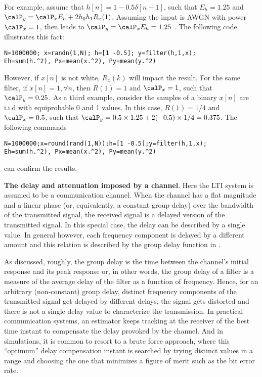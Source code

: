 For example, assume that $h[n]=1 - 0.5 \delta[n-1]$, such that $E_h = 1.25$ and $\calP_y = \calP_x E_h + 2 h_0 h_1 R_x(1)$. Assuming the input is AWGN with power $\calP_x=1$, then  leads to $\calP_y = \calP_x E_h = 1.25$ . The following code illustrates this fact:
\begin{lstlisting}
N=1000000; x=randn(1,N); h=[1 -0.5]; y=filter(h,1,x);
Eh=sum(h.^2), Px=mean(x.^2), Py=mean(y.^2)
\end{lstlisting}
However, if $x[n]$ is not white, $R_x(k)$ will impact the result. For the same filter, if $x[n]=1, \forall n$, then $R(1)=1$ and $\calP_x=1$, such that $\calP_y = 0.25$. As a third example, consider the samples of a binary $x[n]$ are i.i.d with equiprobable 0 and 1 values. In this case, $R(1)=1/4$ and $\calP_x=0.5$, such that $\calP_y = 0.5 \times 1.25 + 2(-0.5) \times 1/4 = 0.375$. The following commands
\begin{lstlisting}
N=1000000;x=round(rand(1,N));h=[1 -0.5];y=filter(h,1,x);
Eh=sum(h.^2), Px=mean(x.^2), Py=mean(y.^2)
\end{lstlisting}
can confirm the results.
\eApplication

\bApplication \textbf{The delay and attenuation imposed by a channel}.
\label{app:linear_filtering}
Here the LTI system is assumed to be a communication channel.
When the channel has a flat magnitude and a linear phase (or, equivalently, a constant group delay) over the bandwidth of the transmitted signal, the received signal is a delayed version of the transmitted signal. In this special case, the delay can be described by a single value. In general however, each frequency component is delayed by a different amount and this relation is described by the group delay function in .

As discussed, roughly, the group delay is the time between the channel's initial response and its peak response or, in other words, the group delay of a filter is a measure of the average delay of the filter as a function of frequency. Hence, for an arbitrary (non-constant) group delay, distinct frequency components of the transmitted signal get delayed by different delays, the signal gets distorted and there is not a single delay value to characterize the transmission. In practical communication systems, an estimator keeps tracking at the receiver of the best time instant to compensate the delay provoked by the channel. And in simulations, it is common to resort to a brute force approach, where this ``optimum'' delay compensation instant is searched by trying distinct values in a range and choosing the one that minimizes a figure of merit such as the bit error rate.

